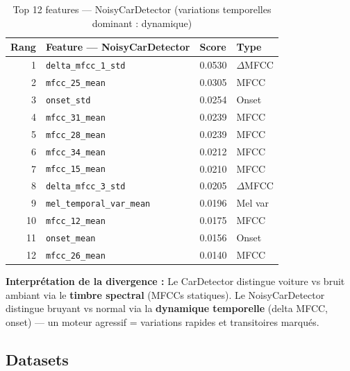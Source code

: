 \documentclass[11pt,a4paper]{article}
\newcommand{\code}[1]{\texttt{\small #1}}
\begin{document}
\begin{table}[htbp]
\centering
\begin{tabular}{@{}rlll@{}}
\toprule
\textbf{Rang} & \textbf{Feature — NoisyCarDetector} & \textbf{Score} & \textbf{Type} \\
\midrule
1 & \code{delta\_mfcc\_1\_std} & 0.0530 & $\Delta$MFCC \\
2 & \code{mfcc\_25\_mean} & 0.0305 & MFCC \\
3 & \code{onset\_std} & 0.0254 & Onset \\
4 & \code{mfcc\_31\_mean} & 0.0239 & MFCC \\
5 & \code{mfcc\_28\_mean} & 0.0239 & MFCC \\
6 & \code{mfcc\_34\_mean} & 0.0212 & MFCC \\
7 & \code{mfcc\_15\_mean} & 0.0210 & MFCC \\
8 & \code{delta\_mfcc\_3\_std} & 0.0205 & $\Delta$MFCC \\
9 & \code{mel\_temporal\_var\_mean} & 0.0196 & Mel var \\
10 & \code{mfcc\_12\_mean} & 0.0175 & MFCC \\
11 & \code{onset\_mean} & 0.0156 & Onset \\
12 & \code{mfcc\_26\_mean} & 0.0140 & MFCC \\
\bottomrule
\end{tabular}
\caption{Top 12 features — NoisyCarDetector (variations temporelles dominant : dynamique)}
\end{table}

\begin{infobox}
\textbf{Interprétation de la divergence :} Le CarDetector distingue voiture vs bruit ambiant
via le \textbf{timbre spectral} (MFCCs statiques). Le NoisyCarDetector distingue bruyant vs
normal via la \textbf{dynamique temporelle} (delta MFCC, onset) — un moteur agressif = variations
rapides et transitoires marqués.
\end{infobox}

\subsection{Datasets}
\end{document}
